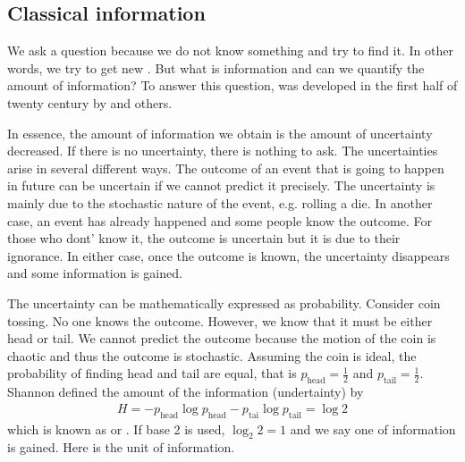 \documentclass[letterpaper,10pt,english]{jupyterBook}
\begin{document}
\subsection{Classical information}
\label{\detokenize{computation/qinfo:classical-information}}
\sphinxAtStartPar
We  ask a question because we do not know something and try to find it.  In other words, we try to get new .  But what is information and can we quantify the amount of information?  To answer this question,  was developed in the first half of twenty century by  and others.

\sphinxAtStartPar
In essence,  the amount of information we obtain is the amount of uncertainty decreased.  If there is no uncertainty, there is nothing to ask.  The uncertainties arise in several different ways.  The outcome of an event that is going to happen in future can be uncertain if we cannot predict it precisely.  The uncertainty is mainly due to the stochastic nature of the event, e.g. rolling a die.  In another case, an event has already happened and some people know the outcome.  For those who dont’ know it, the outcome is uncertain but it is due to their ignorance.  In either case,  once the outcome is known, the uncertainty disappears and some information is gained.

\sphinxAtStartPar
The uncertainty can be mathematically expressed as probability.  Consider coin tossing. No one knows the outcome.  However, we know that it must be either head or tail.  We cannot predict the outcome because the motion of the coin is chaotic and thus the outcome is stochastic.  Assuming the coin is ideal, the probability of finding head and tail are equal, that is \(p_\text{head} = \frac{1}{2}\) and \(p_\text{tail}=\frac{1}{2}\). Shannon defined the amount of the information (undertainty) by
\begin{equation*}
\begin{split}
H = - p_\text{head} \log p_\text{head} - p_\text{tai} \log p_\text{tail} = \log 2
\end{split}
\end{equation*}
\sphinxAtStartPar
which is known as  or .  If base 2 is used, \(\log_2 2 = 1\) and  we say one  of information is gained.  Here  is the unit of information.
\end{document}
